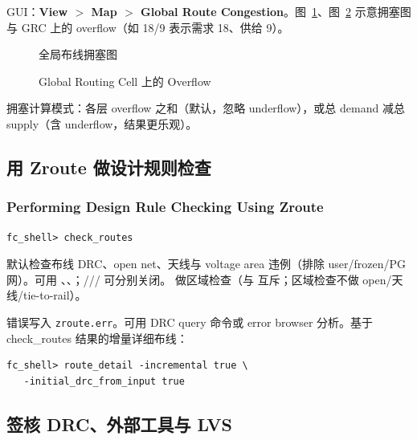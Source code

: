 GUI：\textbf{View $>$ Map $>$ Global Route Congestion}。图~\ref{fig:cong-map}、图~\ref{fig:cong-grc} 示意拥塞图与 GRC 上的 overflow（如 18/9 表示需求 18、供给 9）。

\begin{figure}[htbp]
\centering
{}
\caption{全局布线拥塞图}
\label{fig:cong-map}
\end{figure}

\begin{figure}[htbp]
\centering
{}
\caption{Global Routing Cell 上的 Overflow}
\label{fig:cong-grc}
\end{figure}

拥塞计算模式：各层 overflow 之和（默认，忽略 underflow），或总 demand 减总 supply（含 underflow，结果更乐观）。

\subsection{用 Zroute 做设计规则检查}
\subsubsection*{Performing Design Rule Checking Using Zroute}

\begin{lstlisting}
fc_shell> check_routes
\end{lstlisting}

默认检查布线 DRC、open net、天线与 voltage area 违例（排除 user/frozen/PG 网）。可用 、、；/// 可分别关闭。 做区域检查（与  互斥；区域检查不做 open/天线/tie-to-rail）。

错误写入 \texttt{zroute.err}。可用 DRC query 命令或 error browser 分析。基于 check\_routes 结果的增量详细布线：
\begin{lstlisting}
fc_shell> route_detail -incremental true \
   -initial_drc_from_input true
\end{lstlisting}

\subsection{签核 DRC、外部工具与 LVS}
